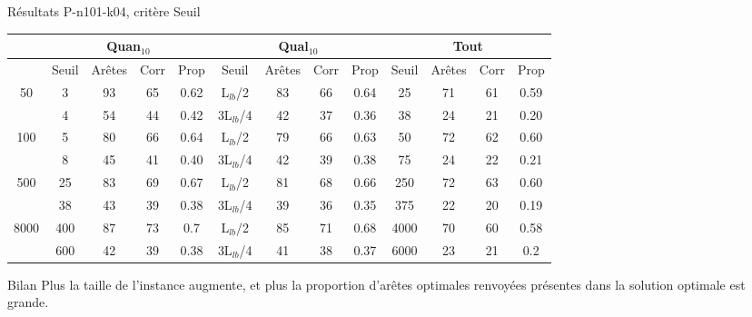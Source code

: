 \documentclass{beamer}
\begin{document}
\begin{frame}{Résultats P-n101-k04, critère Seuil}

\begin{table}[H]

\begin{tabular}{|@{}c@{}|@{}c@{}|@{}c@{}|@{}c@{}|@{}c@{}||@{}c@{}|@{}c@{}|@{}c@{}|@{}c@{}||@{}c@{}|@{}c@{}|@{}c@{}|@{}c@{}|}

\hline
 & \multicolumn{4}{c|}{Quan$_{10}$} & \multicolumn{4}{c|}{Qual$_{10}$} & \multicolumn{4}{c|}{Tout} \\
 \hline
 & Seuil & Arêtes & Corr & Prop & Seuil & Arêtes & Corr & Prop & Seuil & Arêtes & Corr & Prop \\
 \hline
 50 & 3 & 93 & 65 & 0.62 & L$_{lb}$/2 & 83 & 66 & 0.64 & 25 & 71 & 61 & 0.59 \\
 \cline{2-13} 
    & 4 & 54 & 44 & 0.42 & 3L$_{lb}$/4 & 42 & 37 & 0.36 & 38 & 24 & 21 & 0.20  \\
  \hline
   100 & 5 & 80 & 66 & 0.64 & L$_{lb}$/2 & 79 & 66 & 0.63 & 50 & 72 & 62 & 0.60 \\
 \cline{2-13} 
    & 8 & 45 & 41 & 0.40 & 3L$_{lb}$/4 & 42 & 39 & 0.38 & 75 & 24 & 22 & 0.21 \\
  \hline
   500 & 25 & 83 & 69 & 0.67 & L$_{lb}$/2 & 81 & 68 & 0.66 & 250 & 72 & 63 & 0.60 \\
 \cline{2-13} 
    & 38 & 43 & 39 & 0.38 & 3L$_{lb}$/4 & 39 & 36 & 0.35 & 375 & 22 & 20 & 0.19 \\
  \hline
   8000 & 400 & 87 & 73 & 0.7 & L$_{lb}$/2 & 85 & 71 & 0.68 & 4000 & 70 & 60 & 0.58 \\
 \cline{2-13} 
    & 600 & 42 & 39 & 0.38 & 3L$_{lb}$/4 & 41 & 38 & 0.37 & 6000 & 23 & 21 & 0.2 \\
  \hline

\end{tabular}


\end{table}

\begin{block}{Bilan}
Plus la taille de l'instance augmente, et plus la proportion d'arêtes optimales  renvoyées présentes dans la solution optimale est grande.
\end{block}
\end{frame}
\end{document}
